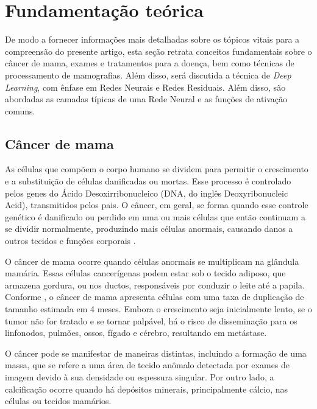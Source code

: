 \section{\esp Fundamentação teórica}  \label{fundteorica}

De modo a fornecer informações mais detalhadas sobre os tópicos vitais para a compreensão do presente artigo, esta seção retrata conceitos fundamentais sobre o câncer de mama, exames e tratamentos para a doença, bem como técnicas de processamento de mamografias. Além disso, será discutida a técnica de \textit{Deep Learning}, com ênfase em Redes Neurais e Redes Residuais. Além disso, são abordadas as camadas típicas de uma Rede Neural e as funções de ativação comuns.


\subsection{\esp Câncer de mama} \label{cancerdemama}
As células que compõem o corpo humano se dividem para permitir o crescimento e a substituição de células danificadas ou mortas. Esse processo é controlado pelos genes do Ácido Desoxirribonucleico (DNA, do inglês Deoxyribonucleic Acid), transmitidos pelos pais. O câncer, em geral, se forma quando esse controle genético é danificado ou perdido em uma ou mais células que então continuam a se dividir normalmente, produzindo mais células anormais, causando danos a outros tecidos e funções corporais \cite{basicOncology}.

O câncer de mama ocorre quando células anormais se multiplicam na glândula mamária. Essas células cancerígenas podem estar sob o tecido adiposo, que armazena gordura, ou nos ductos, responsáveis por conduzir o leite até a papila. Conforme , o câncer de mama apresenta células com uma taxa de duplicação de tamanho estimada em 4 meses. Embora o crescimento seja inicialmente lento, se o tumor não for tratado e se tornar palpável, há o risco de disseminação para os linfonodos, pulmões, ossos, fígado e cérebro, resultando em metástase.

O câncer pode se manifestar de maneiras distintas, incluindo a formação de uma massa, que se refere a uma área de tecido anômalo detectada por exames de imagem devido à sua densidade ou espessura singular. Por outro lado, a calcificação ocorre quando há depósitos minerais, principalmente cálcio, nas células ou tecidos mamários.

